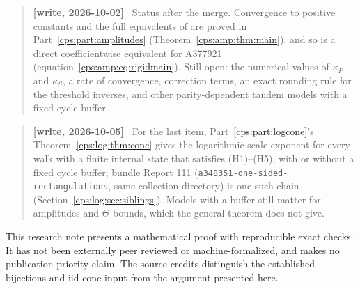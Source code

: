 \documentclass[11pt,letterpaper]{article}
\numberwithin{equation}{section}
\theoremstyle{remark}\newtheorem{remark}[theorem]{Remark}
\newcommand{\repo}[1]{\nolinkurl{#1}}
\newenvironment{writenote}{\begin{quote}\small\sloppy\textbf{[write, 2026-10-02]}\ }{\end{quote}}
\newenvironment{writenotelog}{\begin{quote}\small\sloppy\textbf{[write, 2026-10-05]}\ }{\end{quote}}
\begin{document}
\begin{writenote}
Status after the merge. Convergence to positive constants and the full equivalents of
\cite[Conjecture 25]{FNS} are proved in Part~\ref{cps:part:amplitudes}
(Theorem~\ref{cps:amp:thm:main}), and so is a direct coefficientwise equivalent for A377921
(equation~\eqref{cps:amp:eq:rigidmain}). Still open: the numerical values of $\kappa_P$ and
$\kappa_S$, a rate of convergence, correction terms, an exact rounding rule for the threshold
inverses, and other parity-dependent tandem models with a fixed cycle buffer.
\end{writenote}

\begin{writenotelog}
For the last item, Part~\ref{cps:part:logcone}'s Theorem~\ref{cps:log:thm:cone} gives the
logarithmic-scale exponent for every walk with a finite internal state that satisfies
(H1)--(H5), with or without a fixed cycle buffer; bundle Report 111
(\repo{a348351-one-sided-rectangulations}, same collection directory) is one such chain
(Section~\ref{cps:log:sec:siblings}). Models with a buffer still matter for amplitudes and
$\Theta$ bounds, which the general theorem does not give.
\end{writenotelog}

This research note presents a mathematical proof with reproducible exact checks. It has not been externally peer reviewed or machine-formalized, and makes no publication-priority claim. The source credits distinguish the established bijections and iid cone input from the argument presented here.


\clearpage
\end{document}
